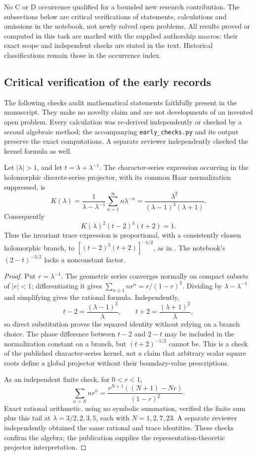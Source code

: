No C or D occurrence qualified for a bounded new research contribution.
The subsections below are critical verifications of statements, calculations
and omissions in the notebook, not newly solved open problems. All results
proved or computed in this task are marked with the supplied authorship
macros; their exact scope and independent checks are stated in the text.
Historical classifications remain those in the occurrence index.

\subsection{Critical verification of the early records}

The following checks audit mathematical statements faithfully present in the manuscript. They make no novelty claim and are not developments of an invented open problem. Every calculation was re-derived independently or checked by a second algebraic method; the accompanying \texttt{early\_checks.py} and its output preserve the exact computations. A separate reviewer independently checked the kernel formula as well.

\begin{proposition}\ours{}
Let \(|\lambda|>1\), and let \(t=\lambda+\lambda^{-1}\). The character-series expression occurring in the holomorphic discrete-series projector, with its common Haar normalization suppressed, is
\[
 K(\lambda)=\frac1{\lambda-\lambda^{-1}}
 \sum_{n=1}^{\infty}n\lambda^{-n}
 =\frac{\lambda^2}{(\lambda-1)^3(\lambda+1)}.
\]
Consequently
\[
 K(\lambda)^2(t-2)^3(t+2)=1.
\]
Thus the invariant trace expression is proportional, with a consistently chosen holomorphic branch, to \([(t-2)^3(t+2)]^{-1/2}\), as in \citet[Theorem~10, equations~18 and~22]{gelfandgindikin1977complex}. The notebook's \((2-t)^{-3/2}\) lacks a nonconstant factor.
\end{proposition}
\begin{proof}
Put \(r=\lambda^{-1}\). The geometric series converges normally on compact subsets of \(|r|<1\); differentiating it gives
\(\sum_{n\ge1}nr^n=r/(1-r)^2\). Dividing by \(\lambda-\lambda^{-1}\) and simplifying gives the rational formula. Independently,
\[
 t-2=\frac{(\lambda-1)^2}{\lambda},\qquad
 t+2=\frac{(\lambda+1)^2}{\lambda},
\]
so direct substitution proves the squared identity without relying on a branch choice. The phase difference between \(t-2\) and \(2-t\) may be included in the normalization constant on a branch, but \((t+2)^{-1/2}\) cannot be. This is a check of the published character-series kernel, not a claim that arbitrary scalar square roots define a global projector without their boundary-value prescriptions.

As an independent finite check, for \(0<r<1\),
\[
 \sum_{n>N}nr^n=\frac{r^{N+1}((N+1)-Nr)}{(1-r)^2}.
\]
Exact rational arithmetic, using no symbolic summation, verified the finite sum plus this tail at \(\lambda=3/2,2,3,5\), each with \(N=1,2,7,23\). A separate reviewer independently obtained the same rational and trace identities. These checks confirm the algebra; the publication supplies the representation-theoretic projector interpretation.
\end{proof}

